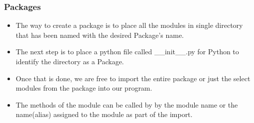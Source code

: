 \documentclass{beamer}
\begin{document}
\begin{frame}
\frametitle{Packages}
\begin{itemize}
\item The way to create a package is to place all the modules in single directory that has been named with the desired Package's name.
\item The next step is to place a python file called \_\_init\_\_.py for Python to identify the directory as a Package.
\item Once that is done, we are free to import the entire package or just the select modules from the package into our program.
\item The methods of the module can be called by by the module name or the name(alias) assigned to the module as part of the import.
\end{itemize}
\end{frame}
\end{document}
